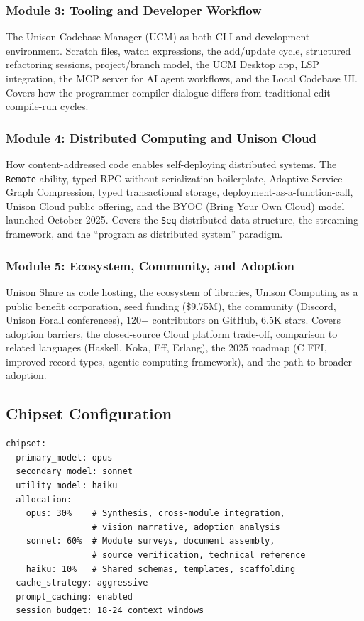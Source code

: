 \documentclass[11pt,letterpaper]{article}
\begin{document}
\subsubsection{Module 3: Tooling and Developer Workflow}
The Unison Codebase Manager (UCM) as both CLI and development environment. Scratch files, watch expressions, the add/update cycle, structured refactoring sessions, project/branch model, the UCM Desktop app, LSP integration, the MCP server for AI agent workflows, and the Local Codebase UI. Covers how the programmer-compiler dialogue differs from traditional edit-compile-run cycles.

\subsubsection{Module 4: Distributed Computing and Unison Cloud}
How content-addressed code enables self-deploying distributed systems. The \texttt{Remote} ability, typed RPC without serialization boilerplate, Adaptive Service Graph Compression, typed transactional storage, deployment-as-a-function-call, Unison Cloud public offering, and the BYOC (Bring Your Own Cloud) model launched October 2025. Covers the \texttt{Seq} distributed data structure, the streaming framework, and the ``program as distributed system'' paradigm.

\subsubsection{Module 5: Ecosystem, Community, and Adoption}
Unison Share as code hosting, the ecosystem of libraries, Unison Computing as a public benefit corporation, seed funding (\$9.75M), the community (Discord, Unison Forall conferences), 120+ contributors on GitHub, 6.5K stars. Covers adoption barriers, the closed-source Cloud platform trade-off, comparison to related languages (Haskell, Koka, Eff, Erlang), the 2025 roadmap (C FFI, improved record types, agentic computing framework), and the path to broader adoption.

\subsection{Chipset Configuration}

\begin{asciibox}
\begin{verbatim}
chipset:
  primary_model: opus
  secondary_model: sonnet
  utility_model: haiku
  allocation:
    opus: 30%    # Synthesis, cross-module integration,
                 # vision narrative, adoption analysis
    sonnet: 60%  # Module surveys, document assembly,
                 # source verification, technical reference
    haiku: 10%   # Shared schemas, templates, scaffolding
  cache_strategy: aggressive
  prompt_caching: enabled
  session_budget: 18-24 context windows
\end{verbatim}
\end{asciibox}
\end{document}

